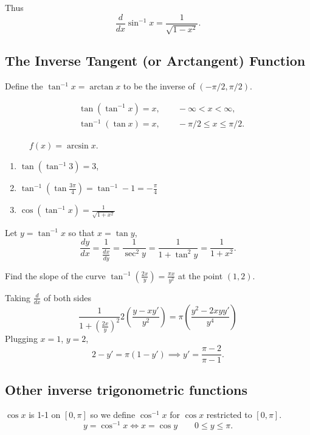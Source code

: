 \documentclass[../main.tex]{subfiles}
\begin{document}
Thus
\[
  \frac{d }{dx} \sin^{-1} x = \frac{1}{\sqrt{1-x^2}}.
\]

\subsection*{The Inverse Tangent (or Arctangent) Function}

Define the $\tan^{-1} x = \arctan x$ to be the inverse of $(-\pi/2, \pi/2)$.

\begin{align*}
  & \tan (\tan^{-1} x) = x, \qquad -\infty < x < \infty, \\
  & \tan^{-1} (\tan x) = x, \qquad -\pi/2 \le x \le \pi/2.
\end{align*}

\begin{figure}[H]
  \centering
  
  \caption{$f(x) = \arcsin x$.}
\end{figure}

\begin{example}
  \begin{enumerate}
    \item $\tan (\tan^{-1} 3) = 3$,
    \item $\tan^{-1} (\tan \frac{3\pi}{4}) = \tan^{-1} -1 = -\frac{\pi}{4}$
    \item $\cos (\tan^{-1} x) = \frac{1}{\sqrt{1+x^2}}$
  \end{enumerate}
\end{example}

Let $y=\tan^{-1} x$ so that $x = \tan y$,
\[
  \frac{dy}{dx} = \frac{1}{\frac{dx}{dy}} = \frac{1}{\sec^2 y} = \frac{1}{1+ \tan^2 y} = \frac{1}{1+x^2}.
\]

\begin{example}
  Find the slope of the curve $\tan^{-1}\left( \frac{2x}{y} \right) = \frac{\pi x}{y^2}$ at the point $(1, 2)$.
\end{example}
\begin{solution}
  Taking $\frac{d}{dx}$ of both sides
  \[
    \frac{1}{1+\left( \frac{2x}{y} \right)^2} 2\left( \frac{y-x y'}{y^2} \right) = \pi \left( \frac{y^2 - 2x y y'}{y^4} \right)
  \]
  Plugging $x=1$, $y=2$,
  \[
    2- y' = \pi (1- y') \implies y' = \frac{\pi-2}{\pi-1}.
  \]
\end{solution}
\subsection*{Other inverse trigonometric functions}
$\cos x$ is 1-1 on $[0, \pi]$ so we define $\cos^{-1} x$ for $\cos x$ restricted to $[0, \pi]$.
\[
  y = \cos^{-1} x \iff x = \cos y \qquad 0 \le y \le \pi.
\]
\end{document}
